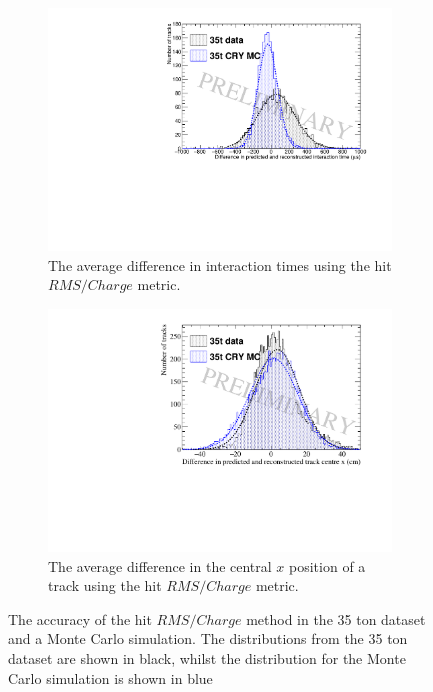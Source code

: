 \begin{figure}[h!]
  \centering
  \begin{subfigure}{0.6\textwidth}
    \centering
    \includegraphics[width=\textwidth]{PredictedTimeFromRMS_IntFits}
    \caption{The average difference in interaction times using the hit $RMS/Charge$ metric.}
    \label{fig:DiffOverlayAvDiff_RMS_Int_T}
  \end{subfigure}

  \begin{subfigure}{0.6\textwidth}
    \centering
    \includegraphics[width=\textwidth]{Overlay_AvXPosDiff_RMS_Int}
    \caption{The average difference in the central $x$ position of a track using the hit $RMS/Charge$ metric.}
    \label{fig:DiffOverlayAvDiff_RMS_Int_X}
  \end{subfigure}
  \caption[Comparing the accuracy of the hit $RMS$ method in the 35 ton dataset and a Monte Carlo simulation]
          {The accuracy of the hit $RMS/Charge$ method in the 35 ton dataset and a Monte Carlo simulation. The distributions from the 35 ton dataset are shown in black, whilst the distribution for the Monte Carlo simulation is shown in blue}
  \label{fig:DiffOverlayAvDiff_RMS_Int}
\end{figure}

